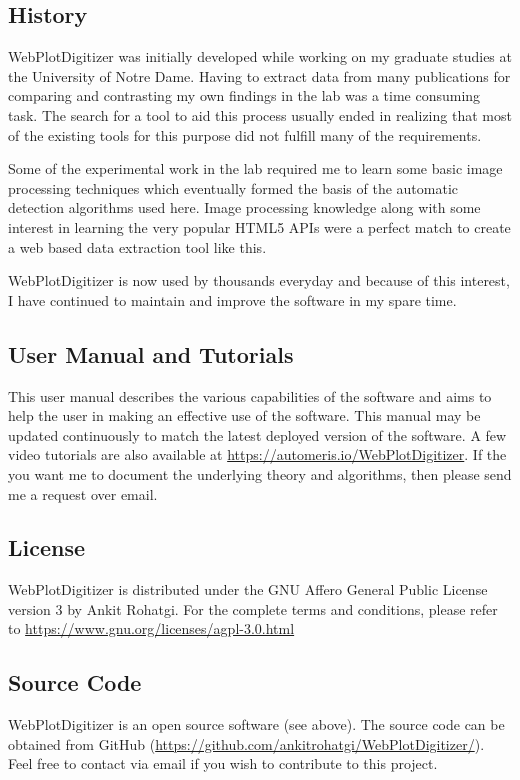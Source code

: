 \documentclass[letterpaper, 11pt]{article}
\begin{document}
\subsection{History}
WebPlotDigitizer was initially developed while working on my graduate studies at the University of Notre Dame. Having to extract data from many publications for comparing and contrasting my own findings in the lab was a time consuming task. The search for a tool to aid this process usually ended in realizing that most of the existing tools for this purpose did not fulfill many of the requirements. 

Some of the experimental work in the lab required me to learn some basic image processing techniques which eventually formed the basis of the automatic detection algorithms used here. Image processing knowledge along with some interest in learning the very popular HTML5 APIs were a perfect match to create a web based data extraction tool like this.

WebPlotDigitizer is now used by thousands everyday and because of this interest, I have continued to maintain and improve the software in my spare time.

\subsection{User Manual and Tutorials}
This user manual describes the various capabilities of the software and aims to help the user in making an effective use of the software. This manual may be updated continuously to match the latest deployed version of the software. A few video tutorials are also available at \url{https://automeris.io/WebPlotDigitizer}. If the you want me to document the underlying theory and algorithms, then please send me a request over email.

\subsection{License}
WebPlotDigitizer is distributed under the GNU Affero General Public License version 3 by Ankit Rohatgi. For the complete terms and conditions, please refer to \url{https://www.gnu.org/licenses/agpl-3.0.html}

\subsection{Source Code}
WebPlotDigitizer is an open source software (see above). The source code can be obtained from GitHub (\url{https://github.com/ankitrohatgi/WebPlotDigitizer/}). Feel free to contact via email if you wish to contribute to this project.
\end{document}

